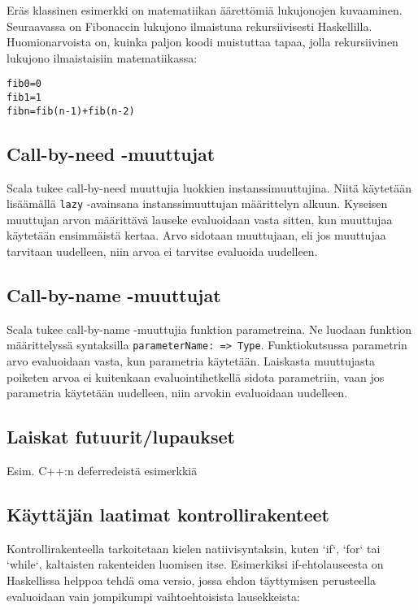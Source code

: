 Eräs klassinen esimerkki on matematiikan äärettömiä lukujonojen kuvaaminen. Seuraavassa on Fibonaccin lukujono ilmaistuna rekursiivisesti Haskellilla. Huomionarvoista on, kuinka paljon koodi muistuttaa tapaa, jolla rekursiivinen lukujono ilmaistaisiin matematiikassa:

\begin{alltt}
fib 0 = 0
fib 1 = 1
fib n = fib (n-1) + fib (n-2)
\end{alltt}

\subsection{Call-by-need -muuttujat}

Scala tukee call-by-need muuttujia luokkien instanssimuuttujina. Niitä käytetään lisäämällä \verb!lazy! -avainsana instanssimuuttujan määrittelyn alkuun. Kyseisen muuttujan arvon määrittävä lauseke evaluoidaan vasta sitten, kun muuttujaa käytetään ensimmäistä kertaa. Arvo sidotaan muuttujaan, eli jos muuttujaa tarvitaan uudelleen, niin arvoa ei tarvitse evaluoida uudelleen.

\subsection{Call-by-name -muuttujat}

Scala tukee call-by-name -muuttujia funktion parametreina. Ne luodaan funktion määrittelyssä syntaksilla \verb!parameterName: => Type!. Funktiokutsussa parametrin arvo evaluoidaan vasta, kun parametria käytetään. Laiskasta muuttujasta poiketen arvoa ei kuitenkaan evaluointihetkellä sidota parametriin, vaan jos parametria käytetään uudelleen, niin arvokin evaluoidaan uudelleen.

\subsection{Laiskat futuurit/lupaukset}

Esim. C++:n deferredeistä esimerkkiä

\subsection{Käyttäjän laatimat kontrollirakenteet}

Kontrollirakenteella tarkoitetaan kielen natiivisyntaksin, kuten `if`, `for` tai `while`, kaltaisten rakenteiden luomisen itse. Esimerkiksi if-ehtolauseesta on Haskellissa helppoa tehdä oma versio, jossa ehdon täyttymisen perusteella evaluoidaan vain jompikumpi vaihtoehtoisista lausekkeista:

